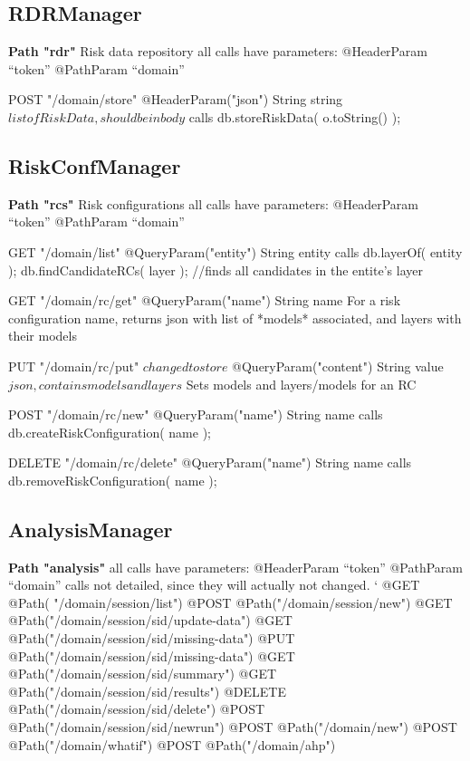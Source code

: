 \subsection{RDRManager}
   
\textbf{Path "rdr"} Risk data repository
all calls have parameters: 
    @HeaderParam ``token''
    @PathParam ``domain''

	POST "/{domain}/store"
	@HeaderParam("json") String string $list of RiskData, should be in body$
	calls db.storeRiskData( o.toString() );
	
\subsection{RiskConfManager}
   
\textbf{Path "rcs"} Risk configurations
all calls have parameters: 
    @HeaderParam ``token''
    @PathParam ``domain''
	
	GET "/{domain}/list"
	@QueryParam("entity") String entity
	calls db.layerOf( entity ); db.findCandidateRCs( layer );
	//finds all candidates in the entite's layer
	
	GET "/{domain}/rc/get"
	@QueryParam("name") String name
	For a risk configuration name, returns json with list of *models* associated, and layers with their models
	
	PUT "/{domain}/rc/put" $changed to store$
	@QueryParam("content") String value $json, contains models and layers$
	Sets models and layers/models for an RC
	
	POST "/{domain}/rc/new"
	@QueryParam("name") String name 
	calls db.createRiskConfiguration( name );
	
	DELETE "/{domain}/rc/delete"
	@QueryParam("name") String name 
	calls db.removeRiskConfiguration( name );
	
	
\subsection{AnalysisManager}
   
\textbf{Path "analysis"}
all calls have parameters: 
    @HeaderParam ``token''	
    @PathParam ``domain''
 calls not detailed, since they will actually not changed.  
   `
    @GET @Path( "/{domain}/session/list")
    @POST @Path("/{domain}/session/new")
    @GET @Path("/{domain}/session/{sid}/update-data")
	@GET @Path("/{domain}/session/{sid}/missing-data")
	@PUT @Path("/{domain}/session/{sid}/missing-data")
	@GET @Path("/{domain}/session/{sid}/summary")
	@GET @Path("/{domain}/session/{sid}/results")
	@DELETE @Path("/{domain}/session/{sid}/delete")
	@POST @Path("/{domain}/session/{sid}/newrun")
	@POST @Path("/{domain}/new")
	@POST @Path("/{domain}/whatif")
	@POST @Path("/{domain}/ahp")


